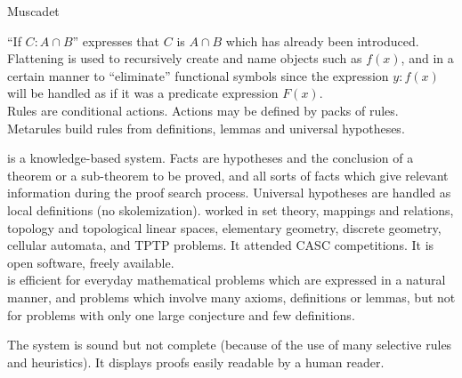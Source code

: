 \begin{entry}{Muscadet}
\begin{clarifications}
``If $C:A \cap B$'' expresses that $C$ is 
$A \cap B$ which has already been introduced.
Flattening is used to recursively create and name objects such as $f(x)$,
and in a certain manner to ``eliminate'' functional symbols since
the expression ${y:f(x)}$ will be handled as if 
it was a predicate expression $F(x)$. \\
Rules are conditional actions. Actions may be defined by packs of rules. 
Metarules build rules from definitions, lemmas and universal hypotheses. 
\end{clarifications}

\begin{history}
{\sc \Muscadet} \cite{pastre:1989,pastre:1993} is a knowledge-based system.
Facts are hypotheses and the conclusion 
of a theorem or a sub-theorem to be proved,
and all sorts of facts which give relevant information
during the proof search process.
Universal hypotheses are handled as local definitions (no skolemization). 
\Muscadet worked in set theory, mappings and relations, 
topology and topological linear spaces, elementary geometry, discrete geometry, 
cellular automata, and TPTP problems. 
It attended CASC competitions.
It is open software, freely available.\\
\Muscadet is efficient for everyday mathematical problems 
which are expressed in a natural manner,
and problems which involve many axioms, definitions or lemmas, 
but not  for problems with only one large conjecture and few definitions.
\end{history}

\begin{technicalities}
The system is sound but not complete (because of the use of many 
selective rules and heuristics).
It displays proofs easily readable by a human reader.
\end{technicalities}
\nocite{pastre:2011}


\end{entry}

